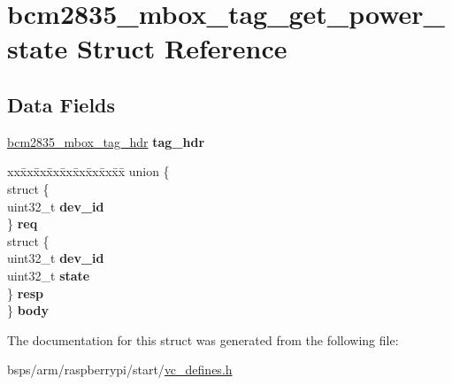 \hypertarget{structbcm2835__mbox__tag__get__power__state}{}\section{bcm2835\+\_\+mbox\+\_\+tag\+\_\+get\+\_\+power\+\_\+state Struct Reference}
\label{structbcm2835__mbox__tag__get__power__state}
\subsection*{Data Fields}
\begin{DoxyCompactItemize}
\item 
\mbox{\label{structbcm2835__mbox__tag__get__power__state_a6946010306e070594ce1e945f793a231}} 
\mbox{\hyperlink{structbcm2835__mbox__tag__hdr}{bcm2835\+\_\+mbox\+\_\+tag\+\_\+hdr}} {\bfseries tag\+\_\+hdr}
\item 
\mbox{\label{structbcm2835__mbox__tag__get__power__state_a5e7aee8b1b4f75c0adff5cb037a6ef9b}} 
\begin{tabbing}
xx\=xx\=xx\=xx\=xx\=xx\=xx\=xx\=xx\=\kill
union \{\\
\>struct \{\\
\>\>uint32\_t {\bfseries dev\_id}\\
\>\} {\bfseries req}\\
\>struct \{\\
\>\>uint32\_t {\bfseries dev\_id}\\
\>\>uint32\_t {\bfseries state}\\
\>\} {\bfseries resp}\\
\} {\bfseries body}\\

\end{tabbing}\end{DoxyCompactItemize}


The documentation for this struct was generated from the following file\+:\begin{DoxyCompactItemize}
\item 
bsps/arm/raspberrypi/start/\mbox{\hyperlink{vc__defines_8h}{vc\+\_\+defines.\+h}}\end{DoxyCompactItemize}

